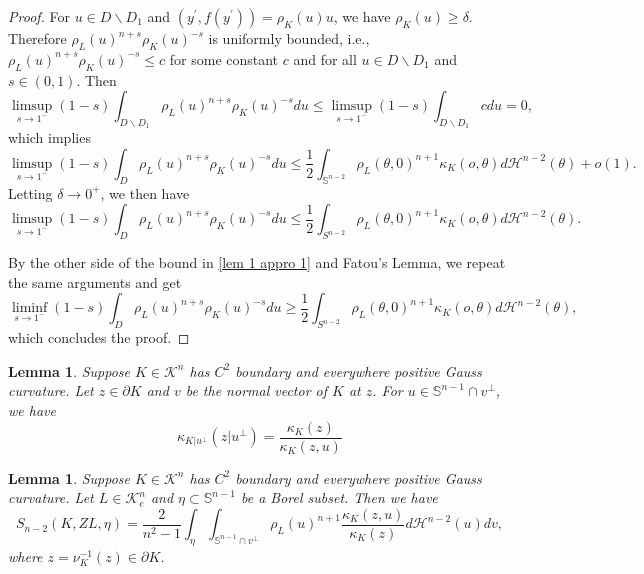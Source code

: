 \documentclass[12pt, oneside,reqno]{amsart}
\numberwithin{equation}{section}
\newtheorem{lemma}[theorem]{Lemma}
\newtheorem{definition and theorem}[theorem]{Definition and Theorem}
\theoremstyle{plain}
\theoremstyle{remark}
\theoremstyle{definition}
\newcommand{\sn}{{\mathbb S}^{n-1}}
\newcommand{\tk}{\mathcal{K}}
\newcommand{\tH}{\mathcal{H}}
\begin{document}
\begin{proof}
    For $u\in D\backslash D_1$ and $(y^{\prime},f(y^{\prime}))=\rho_K(u)u$, we have $\rho_K(u)\ge \delta $. Therefore $\rho_L(u)^{n+s}\rho_K(u)^{-s}$ is uniformly bounded, i.e., $\rho_L(u)^{n+s}\rho_K(u)^{-s}\leq c$ for some constant $c$ and for all $u\in D\backslash D_1$ and $s\in(0,1)$. Then
    \[\limsup_{s\rightarrow 1^{-}}(1-s)\int_{D\backslash D_1}\rho_L(u)^{n+s}\rho_K(u)^{-s}du\leq \limsup_{s\rightarrow 1^{-}}(1-s)\int_{D\backslash D_1} c du=0,\]
    which implies
    \[\limsup_{s\rightarrow 1^-}(1-s)\int_D\rho_L(u)^{n+s}\rho_K(u)^{-s}du\leq \frac{1}{2}\int_{\mathbb S^{n-2}}\rho_L(\theta,0)^{n+1}\kappa_K(o,\theta)d\tH^{n-2}(\theta)
    +o(1).\]
    Letting $\delta\rightarrow 0^+$, we then have
    \[\limsup_{s\rightarrow 1^-}(1-s)\int_D\rho_L(u)^{n+s}\rho_K(u)^{-s}du\leq \frac{1}{2}\int_{S^{n-2}}\rho_L(\theta,0)^{n+1}\kappa_K(o,\theta)d\tH^{n-2}(\theta).\]

    By the other side of the bound in \eqref{lem 1 appro 1} and Fatou's Lemma, we repeat the same arguments and get
    \[\liminf_{s\rightarrow 1^-}(1-s)\int_D\rho_L(u)^{n+s}\rho_K(u)^{-s}du\geq \frac{1}{2}\int_{S^{n-2}}\rho_L(\theta,0)^{n+1}\kappa_K(o,\theta)d\tH^{n-2}(\theta),\]
    which concludes the proof.
\end{proof}

\begin{lemma}\cite[Lemma 4.1]{XZ}\label{xz-lem}
    Suppose $K\in\tk^n$ has $C^2$ boundary and everywhere positive Gauss curvature. Let $z\in\partial K$ and $v$ be the normal vector of $K$ at $z$. For $u\in\sn\cap v^{\perp}$, we have
    \[\kappa_{K|u^{\perp}}(z|u^{\perp})=\frac{\kappa_K(z)}{\kappa_K(z,u)}\]
\end{lemma}

\begin{lemma}\label{conv1}
Suppose $K\in\tk^n$ has $C^2$ boundary and everywhere positive Gauss curvature. Let $L\in\tk_e^n$ and  $\eta\subset\sn$ be a Borel subset. Then we have
    \[S_{n-2}(K,ZL,\eta)=\frac{2}{n^2-1}\int_{\eta}\int_{\sn\cap v^{\perp}}\rho_L(u)^{n+1}\frac{\kappa_K(z,u)}{\kappa_K(z)}d\tH^{n-2}(u)dv,\]
    where $z=\nu_K^{-1}(z)\in\partial K$.
\end{lemma}
\end{document}
